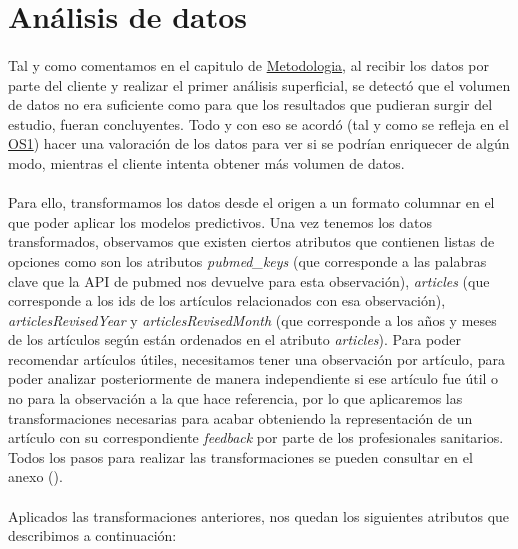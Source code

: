 \section{Análisis de datos}
\label{section:analisis_datos}

\paragraph{}
Tal y como comentamos en el capitulo de \hyperref[chapter:metodologia]{Metodologia}, al recibir los datos por parte del cliente y realizar el primer análisis superficial, se detectó que el volumen de datos no era suficiente como para que los resultados que pudieran surgir del estudio, fueran concluyentes. Todo y con eso se acordó (tal y como se refleja en el \hyperref[os:OS1]{OS1}) hacer una valoración de los datos para ver si se podrían enriquecer de algún modo, mientras el cliente intenta obtener más volumen de datos.

\paragraph{}
Para ello, transformamos los datos desde el origen a un formato columnar en el que poder aplicar los modelos predictivos. Una vez tenemos los datos transformados, observamos que existen ciertos atributos que contienen listas de opciones como son los atributos \textit{pubmed\_keys} (que corresponde a las palabras clave que la API\cite{ref:pubmed_api} de pubmed nos devuelve para esta observación), \textit{articles} (que corresponde a los ids de los artículos relacionados con esa observación), \textit{articlesRevisedYear} y \textit{articlesRevisedMonth} (que corresponde a los años y meses de los artículos según están ordenados en el atributo \textit{articles}). Para poder recomendar artículos útiles, necesitamos tener una observación por artículo, para poder analizar posteriormente de manera independiente si ese artículo fue útil o no para la observación a la que hace referencia, por lo que aplicaremos las transformaciones necesarias para acabar obteniendo la representación de un artículo con su correspondiente \textit{feedback} por parte de los profesionales sanitarios. Todos los pasos para realizar las transformaciones se pueden consultar en el anexo ().

\paragraph{}
Aplicados las transformaciones anteriores, nos quedan los siguientes atributos que describimos a continuación:

